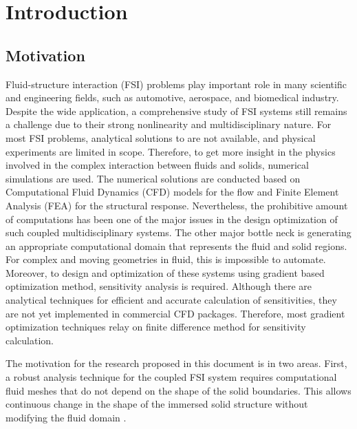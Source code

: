 \chapter{Introduction}
\section{Motivation}
Fluid-structure interaction (FSI) problems play important role in many scientific and engineering fields, such as automotive, aerospace, and biomedical industry. Despite the wide application, a comprehensive study of FSI systems still remains a challenge due to their strong nonlinearity and multidisciplinary nature. For most FSI problems, analytical solutions to are not available, and physical experiments are limited in scope. Therefore, to get more insight in the physics involved in the complex interaction between fluids and solids, numerical simulations are used. The numerical solutions are conducted based on Computational Fluid Dynamics (CFD) models for the flow and Finite Element Analysis (FEA) for the structural response. Nevertheless, the prohibitive amount of computations has been one of the major issues in the design optimization of such coupled multidisciplinary systems. The other major bottle neck is generating an appropriate computational domain that represents the fluid and solid regions. For complex and moving geometries in fluid, this is impossible to automate. Moreover, to design and optimization of these systems using gradient based optimization method, sensitivity analysis is required. Although there are analytical techniques for efficient and accurate calculation of sensitivities, they are not yet implemented in commercial CFD packages. Therefore, most gradient optimization techniques relay on finite difference method for sensitivity calculation.

The motivation for the research proposed in this document is in two areas. First, a robust analysis technique for the coupled FSI system requires computational fluid meshes that do not depend on the shape of the solid boundaries. This allows continuous change in the shape of the immersed solid structure without modifying the fluid domain .


